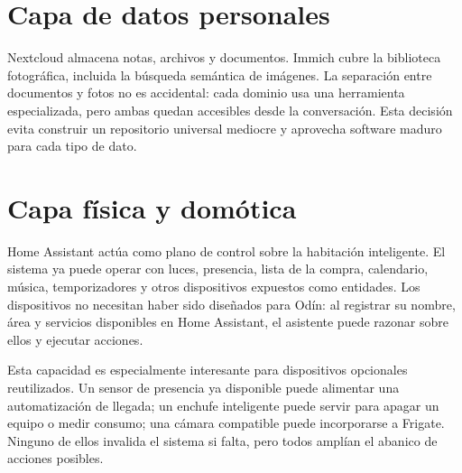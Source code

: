 \section{Capa de datos personales}
Nextcloud almacena notas, archivos y documentos. Immich cubre la biblioteca fotográfica, incluida la búsqueda semántica de imágenes. La separación entre documentos y fotos no es accidental: cada dominio usa una herramienta especializada, pero ambas quedan accesibles desde la conversación. Esta decisión evita construir un repositorio universal mediocre y aprovecha software maduro para cada tipo de dato.

\section{Capa física y domótica}
Home Assistant actúa como plano de control sobre la habitación inteligente. El sistema ya puede operar con luces, presencia, lista de la compra, calendario, música, temporizadores y otros dispositivos expuestos como entidades. Los dispositivos no necesitan haber sido diseñados para Odín: al registrar su nombre, área y servicios disponibles en Home Assistant, el asistente puede razonar sobre ellos y ejecutar acciones.

Esta capacidad es especialmente interesante para dispositivos opcionales reutilizados. Un sensor de presencia ya disponible puede alimentar una automatización de llegada; un enchufe inteligente puede servir para apagar un equipo o medir consumo; una cámara compatible puede incorporarse a Frigate. Ninguno de ellos invalida el sistema si falta, pero todos amplían el abanico de acciones posibles.


